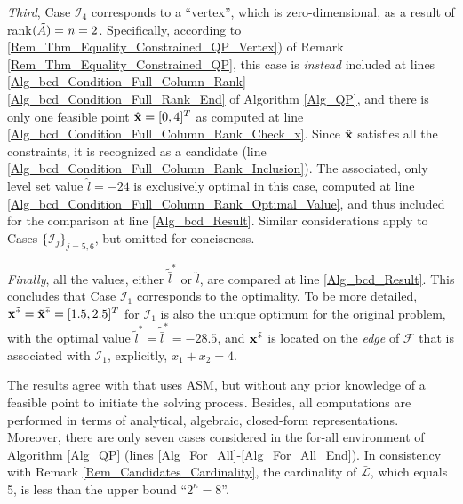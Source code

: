 \documentclass{imaman}
\newcommand{\bfx}{{\bf x}}
\newcommand{\calF}{{\mathcal F}}
\newcommand{\calI}{{\mathcal I}}
\newcommand{\calL}{{\mathcal L}}
\newcommand{\itn}{{\it n}}
\numberwithin{equation}{section}
\begin{document}
\begin{example}
\textit{Third}, Case $\calI_4$ corresponds to a ``vertex'', which is zero-dimensional, as a result of rank$(\tilde A)=\itn=2$. Specifically, according to \ref{Rem_Thm_Equality_Constrained_QP_Vertex}) of Remark \ref{Rem_Thm_Equality_Constrained_QP}, this case is \textit{instead} included at lines \ref{Alg_bcd_Condition_Full_Column_Rank}-\ref{Alg_bcd_Condition_Full_Rank_End} of Algorithm \ref{Alg_QP}, and there is only one feasible point $\hat\bfx=[0,4]^T$ as computed at line \ref{Alg_bcd_Condition_Full_Column_Rank_Check_x}. Since $\hat\bfx$ satisfies all the constraints, it is recognized as a candidate (line \ref{Alg_bcd_Condition_Full_Column_Rank_Inclusion}). The associated, only level set value $\hat l=-24$ is exclusively optimal in this case, computed at line \ref{Alg_bcd_Condition_Full_Column_Rank_Optimal_Value}, and thus included for the comparison at line \ref{Alg_bcd_Result}. Similar considerations apply to Cases $\{\calI_j\}_{j=5,6}$, but omitted for conciseness.

\textit{Finally}, all the values, either $\tilde{\bar l}^*$ or $\hat l$, are compared at line \ref{Alg_bcd_Result}. This concludes that Case $\calI_1$ corresponds to the optimality. To be more detailed, $\bfx^{\tilde *}=\tilde\bfx^{\bar *}=[1.5,2.5]^T$ for $\calI_1$ is also the unique optimum for the original problem, with the optimal value $\tilde l^*=\tilde{\bar l}^*=-28.5$, and $\bfx^{\tilde *}$ is located on the \textit{edge} of $\calF$ that is associated with $\calI_1$, explicitly, $x_1+x_2=4$.

\begin{remark}
The results agree with \cite{Lu(Ye):03(16)} that uses ASM, but without any prior knowledge of a feasible point to initiate the solving process. Besides, all computations are performed in terms of analytical, algebraic, closed-form representations. Moreover, there are only seven cases considered in the for-all environment of Algorithm \ref{Alg_QP} (lines \ref{Alg_For_All}-\ref{Alg_For_All_End}). In consistency with Remark \ref{Rem_Candidates_Cardinality}, the cardinality of $\bar\calL$, which equals 5, is less than the upper bound ``$2^\kappa=8$''.
\label{Rem_Ex_QP_Nonsingular}
\end{remark}

\label{Ex_QP_Nonsingular}
\end{example}
\end{document}
